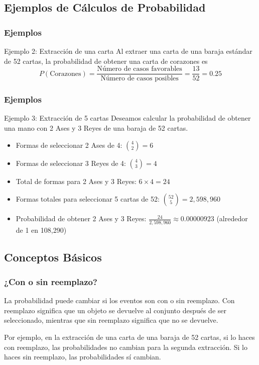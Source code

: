 \documentclass[aspectratio=169]{beamer}
\begin{document}
\subsection{Ejemplos de Cálculos de Probabilidad}
\begin{frame}
\frametitle{Ejemplos}


\begin{block}{Ejemplo 2: Extracción de una carta}
Al extraer una carta de una baraja estándar de 52 cartas, la probabilidad de obtener una carta de corazones es
\[
P(\text{Corazones}) = \frac{\text{Número de casos favorables}}{\text{Número de casos posibles}} = \frac{13}{52} = 0.25
\]
\end{block}

\end{frame}




\begin{frame}
\frametitle{Ejemplos}

\begin{block}{Ejemplo 3: Extracción de 5 cartas}
Deseamos calcular la probabilidad de obtener una mano con 2 Ases y 3 Reyes de una baraja de 52 cartas.

\begin{itemize}
    \item Formas de seleccionar 2 Ases de 4: \(\binom{4}{2} = 6\)
    \item Formas de seleccionar 3 Reyes de 4: \(\binom{4}{3} = 4\)
    \item Total de formas para 2 Ases y 3 Reyes: \(6 \times 4 = 24\)
    \item Formas totales para seleccionar 5 cartas de 52: \(\binom{52}{5} = 2,598,960\)
    \item Probabilidad de obtener 2 Ases y 3 Reyes: \(\frac{24}{2,598,960} \approx 0.00000923\) (alrededor de 1 en 108,290)
\end{itemize}

\end{block}
\end{frame}



\subsection{Conceptos Básicos}
\begin{frame}
\frametitle{¿Con o sin reemplazo?}
La probabilidad puede cambiar si los eventos son con o sin reemplazo. Con reemplazo significa que un objeto se devuelve al conjunto después de ser seleccionado, mientras que sin reemplazo significa que no se devuelve.

\vfill

Por ejemplo, en la extracción de una carta de una baraja de 52 cartas, si lo haces con reemplazo, las probabilidades no cambian para la segunda extracción. Si lo haces sin reemplazo, las probabilidades sí cambian.
\end{frame}
\end{document}
